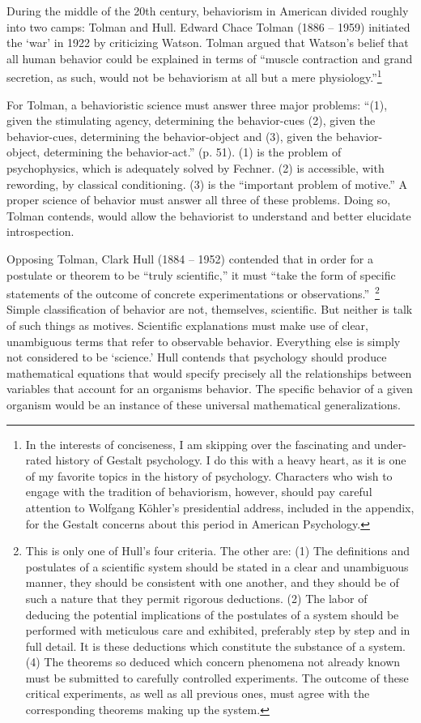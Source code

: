 \begin{refsection}
During the middle of the 20th century, behaviorism in American divided roughly into two camps: Tolman and Hull. Edward Chace Tolman (1886 – 1959) initiated the `war' in 1922 by criticizing Watson. Tolman argued that Watson's belief that all human behavior could be explained in terms of ``muscle contraction and grand secretion, as such, would not be behaviorism at all but a mere physiology.''\footnote{In the interests of conciseness, I am skipping over the fascinating and under-rated history of Gestalt psychology. I do this with a heavy heart, as it is one of my favorite topics in the history of psychology. Characters who wish to engage with the tradition of behaviorism, however, should pay careful attention to Wolfgang Köhler's presidential address, included in the appendix, for the Gestalt concerns about this period in American Psychology.} ~\citep[p. 45]{Tolman:1922us}

For Tolman, a behavioristic science must answer three major problems: ``(1), given the stimulating agency, determining the behavior-cues (2), given the behavior-cues, determining the behavior-object and (3), given the behavior-object, determining the behavior-act.'' (p. 51). (1) is the problem of psychophysics, which is adequately solved by Fechner. (2) is accessible, with rewording, by classical conditioning. (3) is the ``important problem of motive.'' A proper science of behavior must answer all three of these problems. Doing so, Tolman contends, would allow the behaviorist to understand and better elucidate introspection.

Opposing Tolman, Clark Hull (1884 – 1952) contended that in order for a postulate or theorem to be ``truly scientific,'' it must ``take the form of specific statements of the outcome of concrete experimentations or observations.''~\citep{Hull:mFXxOgAu}\footnote{This is only one of Hull's four criteria. The other are: (1) The definitions and postulates of a scientific system should be stated in a clear and unambiguous manner, they should be consistent with one another, and they should be of such a nature that they permit rigorous deductions. (2) The labor of deducing the potential implications of the postulates of a system should be performed with meticulous care and exhibited, preferably step by step and in full detail. It is these deductions which constitute the substance of a system. (4) The theorems so deduced which concern phenomena not already known must be submitted to carefully controlled experiments. The outcome of these critical experiments, as well as all previous ones, must agree with the corresponding theorems making up the system.} Simple classification of behavior are not, themselves, scientific. But neither is talk of such things as motives. Scientific explanations must make use of clear, unambiguous terms that refer to observable behavior. Everything else is simply not considered to be `science.' Hull contends that psychology should produce mathematical equations that would specify precisely all the relationships between variables that account for an organisms behavior. The specific behavior of a given organism would be an instance of these universal mathematical generalizations.


\end{refsection}
